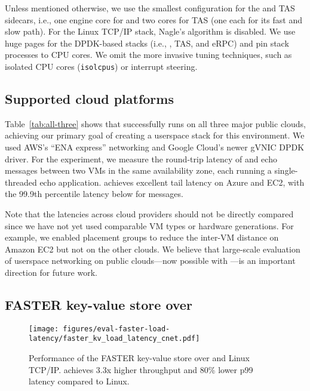 Unless mentioned otherwise, we use the smallest configuration for the \mt{} and TAS sidecars, i.e., one engine core for \mt{} and two cores for TAS (one each for its fast and slow path).
For the Linux TCP/IP stack, Nagle's algorithm is disabled.
We use huge pages for the DPDK-based stacks (i.e., \mt{}, TAS, and eRPC) and pin stack processes to CPU cores.
We omit the more invasive tuning techniques, such as isolated CPU cores (\texttt{isolcpus}) or interrupt steering.

\subsection{Supported cloud platforms}
\label{subsec:cloud-platforms}


Table~\ref{tab:all-three} shows that \mt{} successfully runs on all three major public clouds, achieving our primary goal of creating a userspace stack for this environment.
We used AWS's ``ENA express''\cite{aws-ena} networking and Google Cloud's newer gVNIC DPDK driver\cite{google2023gvnic}.
For the experiment, we measure the round-trip latency of  and  echo messages between two VMs in the same availability zone, each running a single-threaded echo application.
\mt{} achieves excellent tail latency on Azure and EC2, with the 99.9th percentile latency below  for  messages.

Note that the latencies across cloud providers should not be directly compared since we have not yet used comparable VM types or hardware generations.
For example, we enabled placement groups to reduce the inter-VM distance on Amazon EC2 but not on the other clouds.
We believe that large-scale evaluation of userspace networking on public clouds---now possible with \mt{}---is an important direction for future work.


\subsection{FASTER key-value store over \mt{}}
\label{subsec:faster}
\begin{figure}[t!]
    \centering
    \texttt{[image: figures/eval-faster-load-latency/faster\_kv\_load\_latency\_cnet.pdf]}
    \caption{Performance of the FASTER key-value store over \mt{} and Linux TCP/IP.
    \mt{} achieves 3.3x higher throughput and 80\% lower p99 latency compared to Linux.}
    \label{fig:faster}
    \vspace{-0.1in}
\end{figure}

